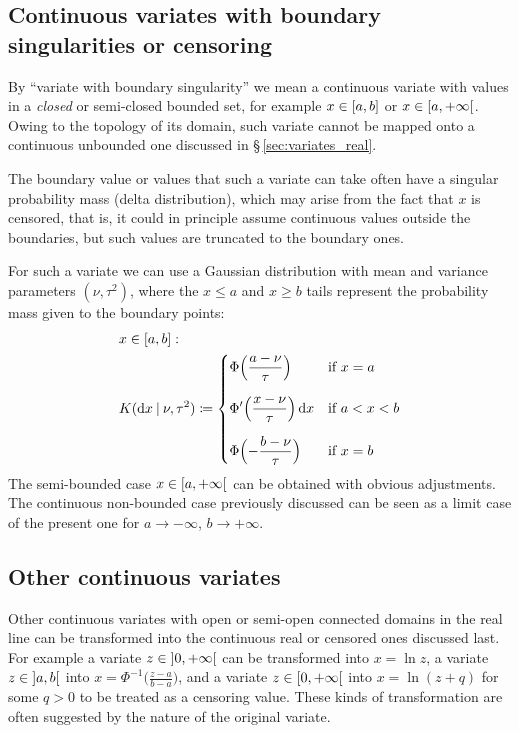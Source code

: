 \documentclass[\ifafour a4paper,12pt,\else a5paper,10pt,\fi%
onecolumn,oneside,article,%
british%
]{memoir}
\theoremstyle{remark}
\theoremstyle{innote}
\newcommand*{\di}{\mathrm{d}}%
\newcommand*{\defd}{\coloneqq}
\renewcommand*{\le}{\leqslant}%
\renewcommand*{\ge}{\geqslant}%
\DeclarePairedDelimiter\clcl{[}{]}
\DeclarePairedDelimiter\clop{[}{[}
\DeclarePairedDelimiter\opop{]}{[}%
\renewcommand*{\|}[1][]{\nonscript\:#1\vert\nonscript\:\mathopen{}}
\newcommand*{\sect}{\S}%
\newcommand*{\mud}{\nu}
\newcommand*{\sigmad}{\tau}
\begin{document}
\subsection{Continuous variates with boundary singularities or censoring}
\label{sec:variates_censored}

By \enquote{variate with boundary singularity} we mean a continuous variate with values in a \emph{closed} or semi-closed bounded set, for example $x \in \clcl{a,b}$ or $x \in \clop{a,+\infty}$. Owing to the topology of its domain, such variate cannot be mapped onto a continuous unbounded one discussed in \sect\,\ref{sec:variates_real}.

The boundary value or values that such a variate can take often have a singular probability mass (delta distribution), which may arise from the fact that $x$ is censored, that is, it could in principle assume continuous values outside the boundaries, but such values are truncated to the boundary ones.

For such a variate we can use a Gaussian distribution with mean and variance parameters $(\mud,\sigmad^{2})$, where the $x \le a$ and $x \ge b$ tails represent the probability mass given to the boundary points:
\begin{equation}
  \begin{split}
    \label{eq:K_cens}
    &x \in \clcl{a,b}:
    \\
    &K(\di x \| \mud, \sigmad^{2}) \defd
    \begin{dcases}
        \Phi\Bigl(
  \frac{a - \mud}{\sigmad}
  \Bigr)
  &\text{if $x=a$}
      \\[2\jot]
        \Phi'\Bigl(
  \frac{x - \mud}{\sigmad}
  \Bigr)
  \, \di x
  &\text{if $a < x < b$}
      \\[2\jot]
        \Phi\Bigl(
  -\frac{b - \mud}{\sigmad}
  \Bigr)
  &\text{if $x=b$}
    \end{dcases}
  \end{split}
\end{equation}
The semi-bounded case $x \in \clop{a,+\infty}$ can be obtained with obvious adjustments. The continuous non-bounded case previously discussed can be seen as a limit case of the present one for $a\to -\infty$, $b\to +\infty$.

\subsection{Other continuous variates}
\label{sec:variates_other}

Other continuous variates with open or semi-open connected domains in the real line can be transformed into the continuous real or censored ones discussed last. For example a variate $z \in \opop{0, +\infty}$ can be transformed into $x=\ln z$, a variate $z \in \opop{a,b}$ into $x=\Phi^{-1}\bigl(\frac{z-a}{b-a}\bigr)$, and a variate $z \in \clop{0, +\infty}$ into $x=\ln(z+q)$ for some $q > 0$ to be treated as a censoring value. These kinds of transformation are often suggested by the nature of the original variate.
\end{document}
